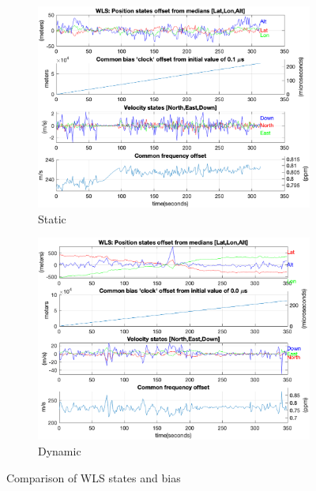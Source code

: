         \begin{figure}[h!]
            \centering
            \begin{subfigure}{0.23\textwidth}
                \includegraphics[width=\textwidth]{images/tests/Monte_Cappuccini/png/Samsung_A51_Monte_Cappuccini_fig5.png}
                \caption{Static}
                \label{fig:WLS_a}
            \end{subfigure}
            \hfill
            \begin{subfigure}{0.23\textwidth}
                \includegraphics[width=\textwidth]{images/tests/Tram_15_trip_Castello_to_Pescatore/filtered/Samsung_A51_Tram_15_trip_Castello_to_Pescatore_fig5.png}
                \caption{Dynamic}
                \label{fig:WLS_b}
            \end{subfigure}
            \vspace{0.35cm}
            \caption{Comparison of WLS states and bias
            \vspace{-0.1cm}
            }
            \label{fig:WLS_comparison}
        \end{figure}
    
